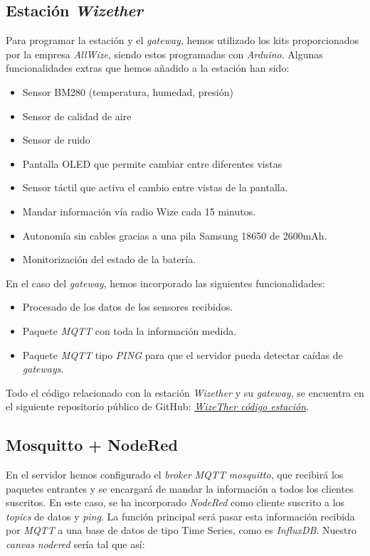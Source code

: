 \documentclass[12pt]{article}
\begin{document}
\subsection{Estación \textit{Wizether}}
Para programar la estación y el \textit{gateway}, hemos utilizado los kits proporcionados por la empresa \textit{AllWize}, siendo estos programadas con \textit{Arduino}. Algunas funcionalidades extras que hemos añadido a la estación han sido:
\begin{itemize}
	\item Sensor BM280 (temperatura, humedad, presión)
	\item Sensor de calidad de aire
	\item Sensor de ruido
	\item Pantalla OLED que permite cambiar entre diferentes vistas
	\item Sensor táctil que activa el cambio entre vistas de la pantalla.
	\item Mandar información vía radio Wize cada 15 minutos.
	\item Autonomía sin cables gracias a una pila Samsung 18650 de 2600mAh.
	\item Monitorización del estado de la batería.
\end{itemize}

\noindent En el caso del \textit{gateway}, hemos incorporado las siguientes funcionalidades:
\begin{itemize}
	\item Procesado de los datos de los sensores recibidos.
	\item Paquete \textit{MQTT} con toda la información medida.
	\item Paquete \textit{MQTT} tipo \textit{PING} para que el servidor pueda detectar caídas de \textit{gateways}.
\end{itemize}

\noindent Todo el código relacionado con la estación \textit{Wizether} y su \textit{gateway}, se encuentra en el siguiente repositorio público de GitHub: \href{https://github.com/Raniita/wizether_resources/tree/master/WizeTher_code}{\textit{WizeTher código estación}}.

\pagebreak

\subsection{Mosquitto + NodeRed}
En el servidor hemos configurado el \textit{broker} \textit{MQTT} \textit{mosquitto}, que recibirá los paquetes entrantes y se encargará de mandar la información a todos los clientes suscritos. En este caso, se ha incorporado \textit{NodeRed} como cliente suscrito a los \textit{topics} de datos y \textit{ping}. La función principal será pasar esta información recibida por \textit{MQTT} a una base de datos de tipo Time Series, como es \textit{InfluxDB}. Nuestro \textit{canvas} \textit{nodered} sería tal que así:
\end{document}
